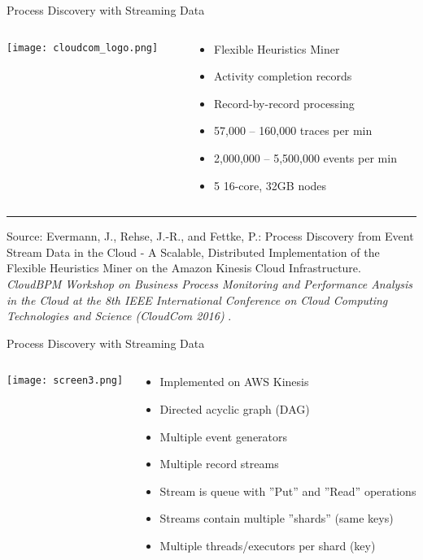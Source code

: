 \documentclass[ignorenonframetext,xcolor=x11names]{beamer}
\begin{document}
\begin{frame}{Process Discovery with Streaming Data}
\begin{columns}
\begin{column}{.3\textwidth}
\texttt{[image: cloudcom\_logo.png]}
\end{column}
\begin{column}{.7\textwidth}
\begin{itemize}
   \item Flexible Heuristics Miner
   \item Activity completion records
   \item Record-by-record processing
   \item 57,000 -- 160,000 traces per min
   \item 2,000,000 -- 5,500,000 events per min
   \item 5 16-core, 32GB nodes
\end{itemize}
\end{column}
\end{columns}
\vspace{\baselineskip}

\hrule

\vspace{\baselineskip}

\footnotesize
Source: Evermann, J., Rehse, J.-R., and Fettke, P.: Process Discovery from Event Stream Data in the Cloud - A Scalable, Distributed Implementation of the Flexible Heuristics Miner on the Amazon Kinesis Cloud Infrastructure. \emph{CloudBPM Workshop on Business Process Monitoring and Performance Analysis in the Cloud at the 8th IEEE International Conference on Cloud Computing Technologies and Science (CloudCom 2016)} .
\end{frame}

\begin{frame}{Process Discovery with Streaming Data}
\begin{columns}
\begin{column}{.4\textwidth}
\texttt{[image: screen3.png]}
\end{column}
\begin{column}{.6\textwidth}
\begin{itemize}
   \item Implemented on AWS Kinesis
   \item Directed acyclic graph (DAG)
   \item Multiple event generators
   \item Multiple record streams
   \item Stream is queue with ''Put'' and ''Read'' operations
   \item Streams contain multiple ''shards'' (same keys)
   \item Multiple threads/executors per shard (key)
\end{itemize}
\end{column}
\end{columns}
\end{frame}
\end{document}
